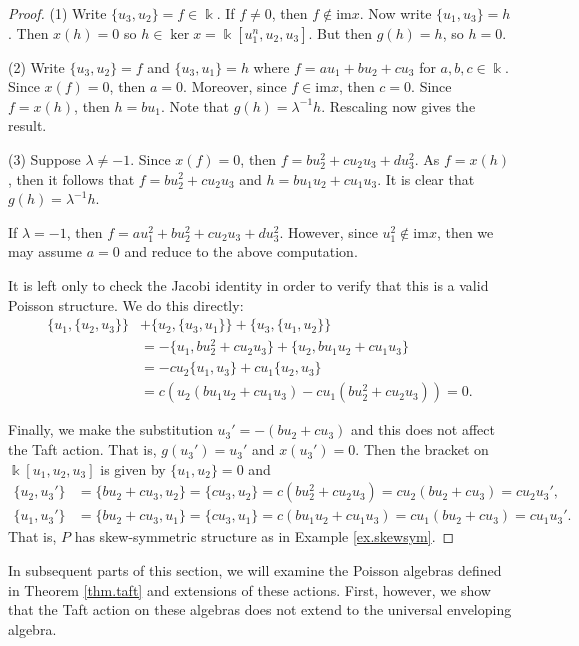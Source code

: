 \documentclass[reqno]{amsart}
\numberwithin{equation}{section}
\theoremstyle{definition}
\newcommand\inv{^{-1}}
\newcommand\kk{\Bbbk}
\begin{document}
\begin{proof}
(1) Write $\{u_3,u_2\}=f \in \kk$. If $f \neq 0$, then $f \notin \mathrm{im} x$. Now write $\{u_1,u_3\} = h$. Then $x(h) = 0$ so $h \in \ker x = \kk[u_1^n,u_2,u_3]$. But then $g(h)=h$, so $h=0$.

(2) Write $\{u_3,u_2\}=f$ and $\{u_3,u_1\}=h$ where $f=au_1+bu_2+cu_3$ for $a,b,c \in \kk$. Since $x(f)=0$, then $a=0$. Moreover, since $f \in \mathrm{im} x$, then $c=0$. Since $f=x(h)$, then $h=bu_1$. Note that $g(h)=\lambda\inv h$. Rescaling now gives the result.

(3) Suppose $\lambda \neq -1$. Since $x(f)=0$, then $f=bu_2^2 + cu_2u_3 + du_3^2$. As $f=x(h)$, then it follows that $f=bu_2^2 + cu_2u_3$ and $h=bu_1u_2 + cu_1u_3$. It is clear that $g(h)=\lambda\inv h$.

If $\lambda=-1$, then $f=au_1^2+bu_2^2 + cu_2u_3 + du_3^2$. However, since $u_1^2 \notin \mathrm{im} x$, then we may assume $a=0$ and reduce to the above computation.

It is left only to check the Jacobi identity in order to verify that this is a valid Poisson structure. We do this directly:
\begin{align*}
\{ u_1, \{u_2,u_3\} \} &+ \{ u_2, \{u_3,u_1\} \} + \{ u_3, \{u_1,u_2\} \} \\
    &= -\{ u_1, bu_2^2 + cu_2u_3\} + \{ u_2, bu_1u_2 + cu_1u_3\} \\
    &= -c u_2 \{ u_1,u_3\} + cu_1 \{u_2,u_3\} \\
    &= c \left( u_2 (bu_1u_2 + cu_1u_3) - cu_1 (bu_2^2 + cu_2u_3) \right) = 0.
\end{align*}

Finally, we make the substitution $u_3' = -(bu_2+cu_3)$ 
and this does not affect the Taft action.
That is, $g(u_3')=u_3'$ and $x(u_3')=0$. Then the bracket 
on $\kk[u_1,u_2,u_3]$ is given by $\{u_1,u_2\}=0$ and
\begin{align*}
\{u_2,u_3'\}
    &= \{ bu_2+cu_3, u_2\} 
    = \{ cu_3,u_2\} = c(bu_2^2 + cu_2u_3)
    = cu_2 (bu_2 + cu_3) = cu_2u_3', \\
\{u_1,u_3'\}
    &= \{ bu_2+cu_3, u_1\} 
    = \{ cu_3,u_1\} = c(bu_1u_2+cu_1u_3)
    = cu_1(bu_2 + cu_3) = cu_1u_3'.
\end{align*}
That is, $P$ has skew-symmetric structure as in Example \ref{ex.skewsym}.
\end{proof}

In subsequent parts of this section, we will examine the Poisson algebras defined in Theorem \ref{thm.taft} and extensions of these actions. First, however, we show that the Taft action on these algebras does not extend to the universal enveloping algebra.
\end{document}

